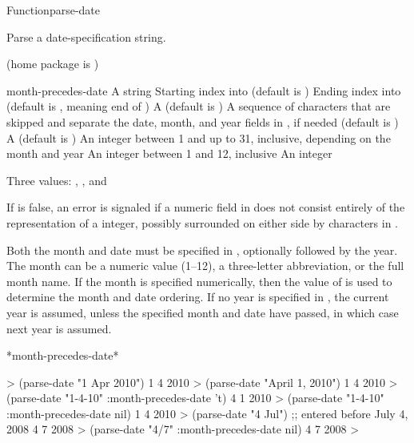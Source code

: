 \documentclass[10pt,twoside,english,pdftex]{article}
\begin{document}
\begin{functiondoc}{Function}{parse-date}{%
     
    \mbox{\returns{} }}
% 

\fnsyntax

\fnpurpose Parse a date-specification string.

\fnpackage {} (home package is )

\fnmodule {}

\fnargs
\begin{args}{month-precedes-date}
\arg[string] A string
\arg[start] Starting index into  (default is )
\arg[end] Ending index into  (default is \nil, meaning
end of )
 A  (default is \nil)
\arg[separators] A sequence of characters that are skipped and separate the
 date, month, and year fields in , if needed (default is 
 )
 A  (default is 
\textbf{})
\arg[date] An integer between 1 and up to 31, inclusive, depending
  on the month and year
\arg[month] An integer between 1 and 12, inclusive
\arg[year] An integer
\end{args}

\fnreturns Three values: , , and 

\fnerrors
%
If  is false, an error is signaled if a numeric field in
 does not consist entirely of the representation of a integer,
possibly surrounded on either side by characters in .

\fndescription
%
Both the month and date must be specified in ,
optionally followed by the year. The month can be a numeric value (1--12), a
three-letter abbreviation, or the full month name.  If the month is specified
numerically, then the value of  is used to
determine the month and date ordering. If no year is specified in
, the current year is assumed, unless the specified month and date
have passed, in which case next year is assumed.

\begin{alsos}{*month-precedes-date*}
\end{alsos}

\fnexamples
%
\W\supp
\begin{example}
  > (parse-date "1 Apr 2010")
  1
  4
  2010
  > (parse-date "April 1, 2010")
  1
  4
  2010\goodpagebreak
  > (parse-date "1-4-10" :month-precedes-date 't)
  4
  1
  2010
  > (parse-date "1-4-10" :month-precedes-date nil)
  1
  4
  2010\goodpagebreak
  > (parse-date "4 Jul") \textcolor{darkergray}{;; entered before July 4, 2008}
  4
  7
  2008
  > (parse-date "4/7" :month-precedes-date nil)
  4
  7
  2008
  >
\end{example}


\end{functiondoc}
\end{document}
